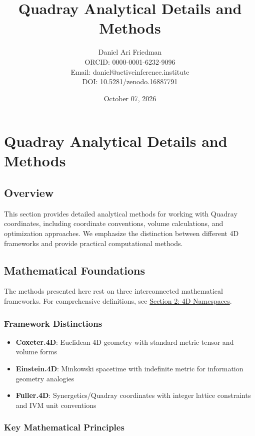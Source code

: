 \documentclass[
  10pt,
]{article}
\title{Quadray Analytical Details and Methods}
\author{Daniel Ari Friedman\\ ORCID: 0000-0001-6232-9096\\ Email: daniel@activeinference.institute\\ DOI: 10.5281/zenodo.16887791}
\date{October 07, 2026}
\providecommand{\tightlist}{%
  \setlength{\itemsep}{0pt}\setlength{\parskip}{0pt}}
\begin{document}
\maketitle

{
\hypersetup{linkcolor=black}
\setcounter{tocdepth}{3}
\tableofcontents
}
\section{Quadray Analytical Details and
Methods}\label{quadray-analytical-details-and-methods}

\subsection{Overview}\label{overview}

This section provides detailed analytical methods for working with
Quadray coordinates, including coordinate conventions, volume
calculations, and optimization approaches. We emphasize the distinction
between different 4D frameworks and provide practical computational
methods.

\subsection{Mathematical Foundations}\label{mathematical-foundations}

The methods presented here rest on three interconnected mathematical
frameworks. For comprehensive definitions, see
\href{02_4d_namespaces.md}{Section 2: 4D Namespaces}.

\subsubsection{Framework Distinctions}\label{framework-distinctions}

\begin{itemize}
\tightlist
\item
  \textbf{Coxeter.4D}: Euclidean 4D geometry with standard metric tensor
  and volume forms
\item
  \textbf{Einstein.4D}: Minkowski spacetime with indefinite metric for
  information geometry analogies\\
\item
  \textbf{Fuller.4D}: Synergetics/Quadray coordinates with integer
  lattice constraints and IVM unit conventions
\end{itemize}

\subsubsection{Key Mathematical
Principles}\label{key-mathematical-principles}
\end{document}

